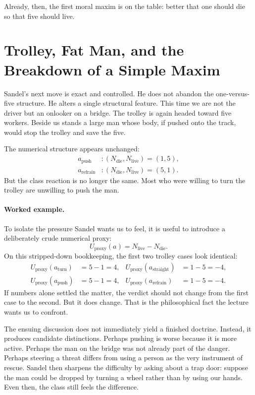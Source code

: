 Already, then, the first moral maxim is on the table: better that one should die so that five should live.

\section{Trolley, Fat Man, and the Breakdown of a Simple Maxim}

Sandel's next move is exact and controlled. He does not abandon the one-versus-five structure. He alters a single structural feature. This time we are not the driver but an onlooker on a bridge. The trolley is again headed toward five workers. Beside us stands a large man whose body, if pushed onto the track, would stop the trolley and save the five.

The numerical structure appears unchanged:
\begin{align}
a_{\text{push}} &: (N_{\text{die}},N_{\text{live}}) = (1,5), \\
a_{\text{refrain}} &: (N_{\text{die}},N_{\text{live}}) = (5,1).
\end{align}
But the class reaction is no longer the same. Most who were willing to turn the trolley are unwilling to push the man.

\paragraph{Worked example.}
To isolate the pressure Sandel wants us to feel, it is useful to introduce a deliberately crude numerical proxy:
\begin{equation}
U_{\text{proxy}}(a) = N_{\text{live}} - N_{\text{die}}.
\end{equation}
On this stripped-down bookkeeping, the first two trolley cases look identical:
\begin{align}
U_{\text{proxy}}(a_{\text{turn}}) &= 5 - 1 = 4, &
U_{\text{proxy}}(a_{\text{straight}}) &= 1 - 5 = -4, \\
U_{\text{proxy}}(a_{\text{push}}) &= 5 - 1 = 4, &
U_{\text{proxy}}(a_{\text{refrain}}) &= 1 - 5 = -4.
\end{align}
If numbers alone settled the matter, the verdict should not change from the first case to the second. But it does change. That is the philosophical fact the lecture wants us to confront.

The ensuing discussion does not immediately yield a finished doctrine. Instead, it produces candidate distinctions. Perhaps pushing is worse because it is more active. Perhaps the man on the bridge was not already part of the danger. Perhaps steering a threat differs from using a person as the very instrument of rescue. Sandel then sharpens the difficulty by asking about a trap door: suppose the man could be dropped by turning a wheel rather than by using our hands. Even then, the class still feels the difference.

